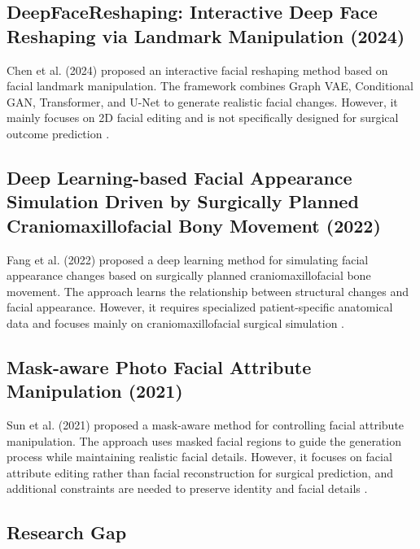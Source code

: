\subsection{DeepFaceReshaping: Interactive Deep Face Reshaping via Landmark Manipulation (2024)}

Chen et al. (2024) proposed an interactive facial reshaping method based on facial landmark manipulation. The framework combines Graph VAE, Conditional GAN, Transformer, and U-Net to generate realistic facial changes. However, it mainly focuses on 2D facial editing and is not specifically designed for surgical outcome prediction \cite{chen2024deepface}.

\clearpage
\subsection{Deep Learning-based Facial Appearance Simulation Driven by Surgically Planned Craniomaxillofacial Bony Movement (2022)}

Fang et al. (2022) proposed a deep learning method for simulating facial appearance changes based on surgically planned craniomaxillofacial bone movement. The approach learns the relationship between structural changes and facial appearance. However, it requires specialized patient-specific anatomical data and focuses mainly on craniomaxillofacial surgical simulation \cite{fang2022acmt}.


\subsection{Mask-aware Photo Facial Attribute Manipulation (2021)}

Sun et al. (2021) proposed a mask-aware method for controlling facial attribute manipulation. The approach uses masked facial regions to guide the generation process while maintaining realistic facial details. However, it focuses on facial attribute editing rather than facial reconstruction for surgical prediction, and additional constraints are needed to preserve identity and facial details \cite{sun2021maskaware}.


\subsection{Research Gap}

